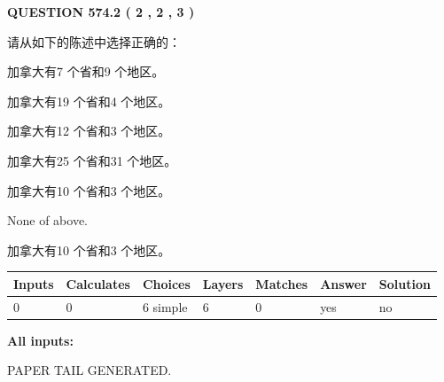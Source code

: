 \documentclass{ctexart}
\begin{document}
   
  
\vspace{0.2in}
  
{\textbf{\Large{QUESTION
574.2 
 ( 2 , 2 , 3 )
}}}
  
  
请从如下的陈述中选择正确的：
 
 
加拿大有7 个省和9 个地区。
 
 
加拿大有19 个省和4 个地区。
 
 
加拿大有12 个省和3 个地区。
 
 
加拿大有25 个省和31 个地区。
 
 
加拿大有10 个省和3 个地区。
 
 
 None of above.
 
 
\noindent{}
 
 
加拿大有10 个省和3 个地区。
 
 
\noindent{}
 
 
   
   
   
   
\noindent\begin{tabular}{|l|l|l|l|l|l|l|}
 \hline
Inputs & Calculates & Choices & Layers & Matches & Answer & Solution \\ \hline
 0  & 
 0  & 
 6
  simple  
  & 
 6  & 
 0  & 
  yes & 
  no 
  \\ \hline
 \end{tabular}
   
   
   
   
\noindent{}
   
   
   
   
\noindent\vspace{0.1in}\hspace{-0.08in} {\textbf{\Large{All inputs: }}}
   
   
   
   
   
   
 \vspace{0.2in}
 
   
   
\vspace{2.0in} PAPER TAIL GENERATED.
   
\end{document}
